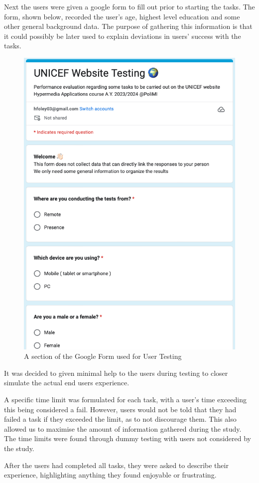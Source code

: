 Next the users were given a google form to fill out prior to starting the tasks. The form, shown below, recorded the user’s age, highest level education and some other general background data. The purpose of gathering this information is that it could possibly be later used to explain deviations in users’ success with the tasks.
\begin{figure}[h]
    \centering
    \includegraphics[scale=0.5]{Resources/Harry/GoogleForm.png}
    \caption{A section of the Google Form used for User Testing}
\end{figure}
It was decided to given minimal help to the users during testing to closer simulate the actual end users experience.

A specific time limit was formulated for each task, with a user’s time exceeding this being considered a fail. However, users would not be told that they had failed a task if they exceeded the limit, as to not discourage them. This also allowed us to maximise the amount of information gathered during the study. The time limits were found through dummy testing with users not considered by the study. 

After the users had completed all tasks, they were asked to describe their experience, highlighting anything they found enjoyable or frustrating. 


